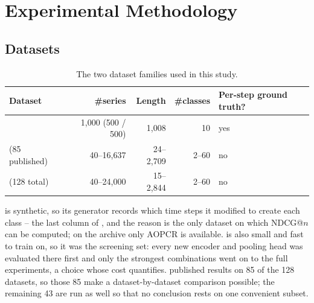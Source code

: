 %

\section{Experimental Methodology}
\label{sec:setup}

\subsection{Datasets}
\label{sec:setup:data}

\begin{table}[h]
\caption{The two dataset families used in this study.}
\label{tab:datasets}
\begin{center}
\small
\begin{tabular}{lrrrl}
\toprule
\textbf{Dataset} & \textbf{\#series} & \textbf{Length} & \textbf{\#classes} &
\textbf{Per-step ground truth?} \\
\midrule
\webtraffic{}         & 1{,}000 (500 / 500) & 1{,}008 & 10 & yes \\
\ucr{} (85 published) & 40--16{,}637 & 24--2{,}709 & 2--60 & no \\
\ucr{} (128 total)    & 40--24{,}000 & 15--2{,}844 & 2--60 & no \\
\bottomrule
\end{tabular}
\end{center}
\end{table}

\webtraffic{} \citep{early2024millet} is synthetic, so its generator records which time steps it
modified to create each class -- the last column of , and the reason
\webtraffic{} is the only dataset on which NDCG@$n$ can be computed; on the \ucr{} archive
\citep{dau2019ucr} only AOPCR is available. \webtraffic{} is also small and fast to train on, so it
was the screening set: every new encoder and pooling head was evaluated there first and only the
strongest combinations went on to the full \ucr{} experiments, a choice whose cost
 quantifies. \citet{early2024millet} published \millet{} results on 85 of the 128
\ucr{} datasets, so those 85 make a dataset-by-dataset comparison possible; the remaining 43 are run
as well so that no conclusion rests on one convenient subset.

